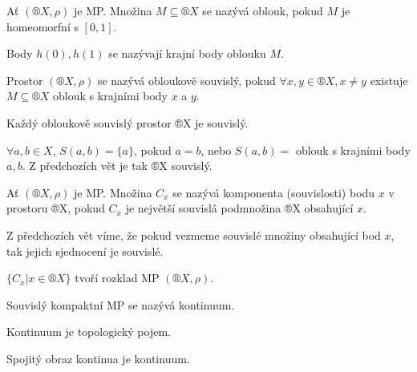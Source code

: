 \documentclass[12pt]{article}					%
\begin{document}
    \begin{definice}
        Ať $(®X, \rho)$ je MP. Množina $M \subseteq ®X$ se nazývá oblouk, pokud $M$ je homeomorfní s $[0, 1]$.

        Body $h(0), h(1)$ se nazývají krajní body oblouku $M$. 

        Prostor $(®X, \rho)$ se nazývá obloukově souvislý, pokud $\forall x, y \in ®X, x ≠ y$ existuje $M \subseteq ®X$ oblouk s krajními body $x$ a $y$.
    \end{definice}

    \begin{dusledek}
        Každý obloukově souvislý prostor ®X je souvislý.

        \begin{dukazin}
            $\forall a, b \in X$, $S(a, b) = \{a\}$, pokud $a = b$, nebo $S(a, b) = $ oblouk s krajními body $a, b$. Z předchozích vět je tak ®X souvislý.
        \end{dukazin}
    \end{dusledek}

    \begin{definice}
        Ať $(®X, \rho)$ je MP. Množina $C_x$ se nazývá komponenta (souvislosti) bodu $x$ v prostoru ®X, pokud $C_x$ je největší souvislá podmnožina ®X obsahující $x$.

        \begin{dukazin}
            Z předchozích vět víme, že pokud vezmeme souvislé množiny obsahující bod $x$, tak jejich sjednocení je souvislé.
        \end{dukazin}
    \end{definice}

    \begin{poznamka}
        $\{C_x | x \in ®X\}$ tvoří rozklad MP $(®X, \rho)$.
    \end{poznamka}

    \begin{definice}
        Souvislý kompaktní MP se nazývá kontinuum.
    \end{definice}

    \begin{poznamka}
        Kontinuum je topologický pojem.

        Spojitý obraz kontinua je kontinuum.
    \end{poznamka}
\end{document}
